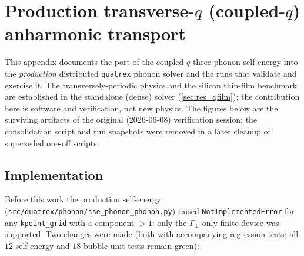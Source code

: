 \chapter{Production transverse-$q$ (coupled-$q$) anharmonic transport}
\label{sec:prod_coupledq}

This appendix documents the port of the coupled-$q$ three-phonon
self-energy into the \emph{production} distributed \texttt{quatrex} phonon
solver and the runs that validate and exercise it. The transversely-periodic
physics and the silicon thin-film benchmark are established in the standalone
(dense) solver (\cref{sec:res_qfilm}); the contribution here is software and
verification, not new physics.
The figures below are the surviving artifacts of the original
(2026-06-08) verification session; the consolidation script and run
snapshots were removed in a later cleanup of superseded one-off
scripts.

\section{Implementation}

Before this work the production self-energy
(\texttt{src/quatrex/phonon/sse\_phonon\_phonon.py}) raised
\texttt{NotImplementedError} for any \texttt{kpoint\_grid} with a
component $>1$: only the $\Gamma_\perp$-only finite device was supported.
Two changes were made (both with accompanying regression tests; all
$12$ self-energy and $18$ bubble unit tests remain green):

